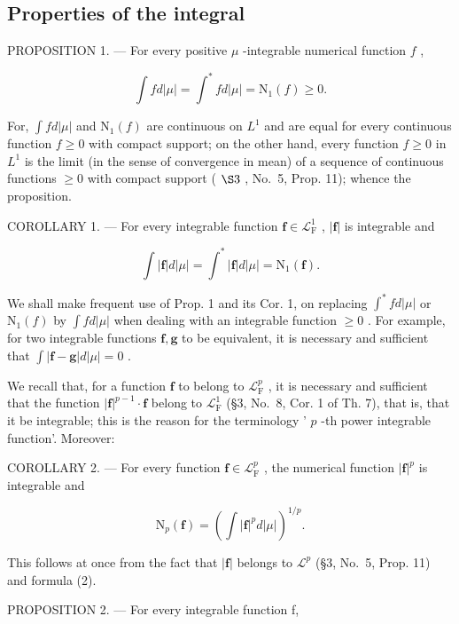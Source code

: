 \subsection{Properties of the integral}

PROPOSITION 1. --- For every positive \(\mu\) -integrable numerical function \(f\) ,

\[
\int f d | \mu | = \int^ {*} f d | \mu | = \mathrm{N} _ {1} (f) \geqslant 0.\tag{2}
\]

For, \(\int f d|\mu|\) and \(\mathrm{N}_{1}(f)\) are continuous on \(L^{1}\) and are equal for every continuous function \(f \geqslant 0\) with compact support; on the other hand, every function \(f \geqslant 0\) in \(L^{1}\) is the limit (in the sense of convergence in mean) of a sequence of continuous functions \(\geqslant 0\) with compact support ( \(\S3\) , No.~5, Prop. 11); whence the proposition.

COROLLARY 1. --- For every integrable function \(\mathbf{f} \in \mathcal{L}_{\mathrm{F}}^{1}\) , \(|\mathbf{f}|\) is integrable and

\[
\int | \mathbf {f} | d | \mu | = \int^ {*} | \mathbf {f} | d | \mu | = \mathrm{N} _ {1} (\mathbf {f}).\tag{3}
\]

We shall make frequent use of Prop. 1 and its Cor. 1, on replacing \(\int^{*}fd|\mu|\) or \(\mathrm{N}_{1}(f)\) by \(\int fd|\mu|\) when dealing with an integrable function \(\geqslant 0\) . For example, for two integrable functions \(\mathbf{f},\mathbf{g}\) to be equivalent, it is necessary and sufficient that \(\int |\mathbf{f} - \mathbf{g}|d|\mu| = 0\) .

We recall that, for a function \(\mathbf{f}\) to belong to \(\mathcal{L}_{\mathrm{F}}^{p}\) , it is necessary and sufficient that the function \(|\mathbf{f}|^{p - 1}\cdot \mathbf{f}\) belong to \(\mathcal{L}_{\mathrm{F}}^{1}\) (§3, No.~8, Cor. 1 of Th. 7), that is, that it be integrable; this is the reason for the terminology ' \(p\) -th power integrable function'. Moreover:

COROLLARY 2. --- For every function \(\mathbf{f} \in \mathcal{L}_{\mathrm{F}}^{p}\) , the numerical function \(|\mathbf{f}|^{p}\) is integrable and

\[
\mathrm{N} _ {p} (\mathbf {f}) = \left(\int | \mathbf {f} | ^ {p} d | \mu |\right) ^ {1 / p}.\tag{4}
\]

This follows at once from the fact that \(|\mathbf{f}|\) belongs to \(\mathcal{L}^p\) (§3, No.~5, Prop. 11) and formula (2).

PROPOSITION 2. --- For every integrable function f,


